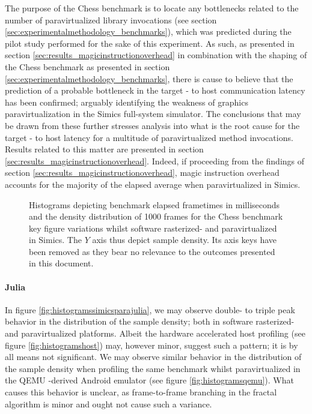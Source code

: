 The purpose of the Chess benchmark is to locate any bottlenecks related to the number of paravirtualized library invocations (see section \ref{sec:experimentalmethodology_benchmarks}), which was predicted during the pilot study performed for the sake of this experiment.
As such, as presented in section \ref{sec:results_magicinstructionoverhead} in combination with the shaping of the Chess benchmark as presented in section \ref{sec:experimentalmethodology_benchmarks}, there is cause to believe that the prediction of a probable bottleneck in the target - to host communication latency has been confirmed; arguably identifying the weakness of graphics paravirtualization in the Simics full-system simulator.
The conclusions that may be drawn from these further stresses analysis into what is the root cause for the target - to host latency for a multitude of paravirtualized method invocations.
Results related to this matter are presented in section \ref{sec:results_magicinstructionoverhead}. 
Indeed, if proceeding from the findings of section \ref{sec:results_magicinstructionoverhead}, magic instruction overhead accounts for the majority of the elapsed average when paravirtualized in Simics.

\begin{figure}
  \centering
  
  \caption[Benchmark results - paravirtualized in Simics, Chess]{Histograms depicting benchmark elapsed frametimes in milliseconds and the density distribution of 1000 frames for the Chess benchmark key figure variations whilst software rasterized- and paravirtualized in Simics. The $Y$ axis thus depict sample density. Its axis keys have been removed as they bear no relevance to the outcomes presented in this document.}
  \label{fig:histogramssimicsparachess}
\end{figure}

\paragraph{Julia}
\label{par:results_julia}
In figure \ref{fig:histogramssimicsparajulia}, we may observe double- to triple peak behavior in the distribution of the sample density; both in software rasterized- and paravirtualized platforms.
Albeit the hardware accelerated host profiling (see figure \ref{fig:histogramshost}) may, however minor, suggest such a pattern; it is by all means not significant.
We may observe similar behavior in the distribution of the sample density when profiling the same benchmark whilst paravirtualized in the QEMU -derived Android emulator (see figure \ref{fig:histogramsqemu}).
What causes this behavior is unclear, as frame-to-frame branching in the fractal algorithm is minor and ought not cause such a variance.

